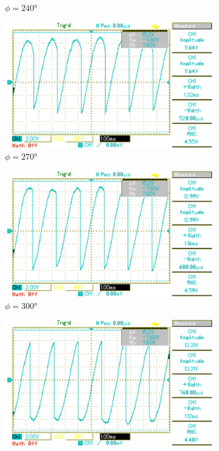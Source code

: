 \begin{figure}[p]
\begin{subfigure}{0.32\textwidth}
		\caption{$\phi=240°$}
	\end{subfigure}
	\begin{subfigure}{0.32\textwidth}
		\includegraphics[width=\textwidth]{Bilder/MAP027.pdf}
		\caption{$\phi=270°$}
	\end{subfigure}
	\begin{subfigure}{0.32\textwidth}
		\includegraphics[width=\textwidth]{Bilder/MAP028.pdf}
		\caption{$\phi=300°$}
	\end{subfigure}
	\begin{subfigure}{0.32\textwidth}
		\includegraphics[width=\textwidth]{Bilder/MAP029.pdf}

\end{subfigure}
\end{figure}
